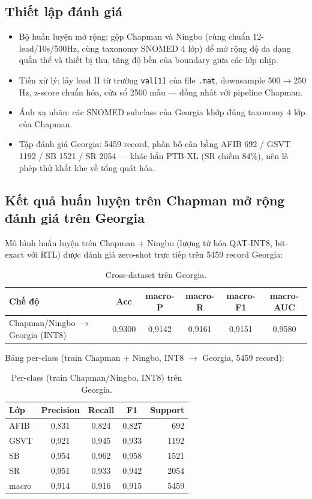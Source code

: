 \documentclass[12pt,a4paper]{article}
\begin{document}
\subsection{Thiết lập đánh giá}
\begin{itemize}
  \item Bộ huấn luyện mở rộng: gộp Chapman và Ningbo (cùng chuẩn 12-lead/10s/500Hz, cùng
        taxonomy SNOMED 4 lớp) để mở rộng độ đa dạng quần thể và thiết bị thu, tăng độ bền của
        boundary giữa các lớp nhịp.
  \item Tiền xử lý: lấy lead II từ trường \texttt{val[1]} của file \texttt{.mat}, downsample
        500$\rightarrow$250 Hz, z-score chuẩn hóa, cửa sổ 2500 mẫu --- đồng nhất với pipeline
        Chapman.
  \item Ánh xạ nhãn: các SNOMED subclass của Georgia khớp đúng taxonomy 4 lớp của Chapman.
  \item Tập đánh giá Georgia: 5459 record, phân bố cân bằng AFIB 692 / GSVT 1192 / SB 1521 /
        SR 2054 --- khác hẳn PTB-XL (SR chiếm 84\%), nên là phép thử khắt khe về tổng quát hóa.
\end{itemize}

\subsection{Kết quả huấn luyện trên Chapman mở rộng đánh giá trên Georgia}

Mô hình huấn luyện trên Chapman + Ningbo (lượng tử hóa QAT-INT8, bit-exact với RTL) được
đánh giá zero-shot trực tiếp trên 5459 record Georgia:

\begin{table}[h]
\centering
\caption{Cross-dataset trên Georgia.}
\begin{tabular}{lccccc}
\toprule
\textbf{Chế độ} & \textbf{Acc} & \textbf{macro-P} & \textbf{macro-R} & \textbf{macro-F1} & \textbf{macro-AUC}\\
\midrule
Chapman/Ningbo $\rightarrow$ Georgia (INT8) & 0,9300 & 0,9142 & 0,9161 & 0,9151 & 0,9580\\
\bottomrule
\end{tabular}
\end{table}

Bảng per-class (train Chapman + Ningbo, INT8 $\rightarrow$ Georgia, 5459 record):

\begin{table}[h]
\centering
\caption{Per-class (train Chapman/Ningbo, INT8) trên Georgia.}
\begin{tabular}{lcccr}
\toprule
\textbf{Lớp} & \textbf{Precision} & \textbf{Recall} & \textbf{F1} & \textbf{Support}\\
\midrule
AFIB & 0,831 & 0,824 & 0,827 & 692\\
GSVT & 0,921 & 0,945 & 0,933 & 1192\\
SB & 0,954 & 0,962 & 0,958 & 1521\\
SR & 0,951 & 0,933 & 0,942 & 2054\\
macro & 0,914 & 0,916 & 0,915 & 5459\\
\bottomrule
\end{tabular}
\end{table}
\end{document}
